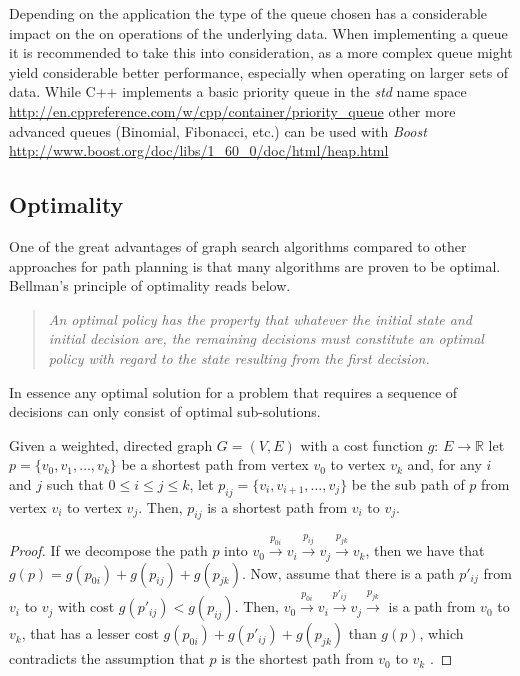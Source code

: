 Depending on the application the type of the queue chosen has a considerable impact on the on operations of the underlying data. When implementing a queue it is recommended to take this into consideration, as a more complex queue might yield considerable better performance, especially when operating on larger sets of data. While C++ implements a basic priority queue in the \emph{std} name space \url{http://en.cppreference.com/w/cpp/container/priority_queue} other more advanced queues (Binomial, Fibonacci, etc.) can be used with \emph{Boost} \url{http://www.boost.org/doc/libs/1_60_0/doc/html/heap.html}

\subsection{Optimality}
One of the great advantages of graph search algorithms compared to other approaches for path planning is that many algorithms are proven to be optimal. Bellman's principle of optimality reads below.
\begin{quotation}
    \noindent \emph{An optimal policy has the property that whatever the initial state and initial decision are, the remaining decisions must constitute an optimal policy with regard to the state resulting from the first decision.} \cite{Bellman.2003}
\end{quotation}

In essence any optimal solution for a problem that requires a sequence of decisions can only consist of optimal sub-solutions.

\begin{lemma}
    Given a weighted, directed graph $G = (V,E)$ with a cost function $g$: $E \rightarrow \mathbb{R}$ let $p = \{v_0, v_1,\ldots, v_k\}$ be a shortest path from vertex $v_0$ to vertex $v_k$ and, for any $i$ and $j$ such that $0 \leq i \leq j \leq k$, let $p_{ij} = \{v_i, v_{i+1},\ldots, v_j\}$ be the sub path of $p$ from vertex $v_i$ to vertex $v_j$. Then, $p_{ij}$ is a shortest path from $v_i$ to $v_j$.
\end{lemma}
 
\begin{proof}
    If we decompose the path $p$ into $v_0 \xrightarrow{p_{0i}} v_i \xrightarrow{p_{ij}} v_j \xrightarrow{p_{jk}} v_k$, then we have that $g(p) = g(p_{0i}) + g(p_{ij}) + g(p_{jk})$. Now, assume that there is a path $p'_{ij}$ from $v_i$ to $v_j$ with cost $g(p'_{ij}) < g(p_{ij})$. Then, $v_0 \xrightarrow{p_{0i}} v_i \xrightarrow{p'_{ij}} v_j \xrightarrow{p_{jk}}$ is a path from $v_0$ to $v_k$, that has a lesser cost $g(p_{0i}) + g(p'_{ij}) + g(p_{jk})$ than $g(p)$, which contradicts the assumption that $p$ is the shortest path from $v_0$ to $v_k$ \cite{Cormen.2009}.
\end{proof}


